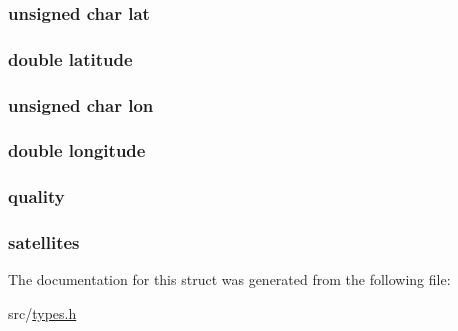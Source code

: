 \subsubsection[{\texorpdfstring{lat}{lat}}]{\setlength{\rightskip}{0pt plus 5cm}unsigned char lat}\hypertarget{structgga_a6a2e4ad53afd61fcd716002fc2965220}{}\label{structgga_a6a2e4ad53afd61fcd716002fc2965220}
\subsubsection[{\texorpdfstring{latitude}{latitude}}]{\setlength{\rightskip}{0pt plus 5cm}double latitude}\hypertarget{structgga_a76714bdbc5c536fa77dfb14533ff82a9}{}\label{structgga_a76714bdbc5c536fa77dfb14533ff82a9}
\subsubsection[{\texorpdfstring{lon}{lon}}]{\setlength{\rightskip}{0pt plus 5cm}unsigned char lon}\hypertarget{structgga_a7e55b80071251dcef4239e60122980a4}{}\label{structgga_a7e55b80071251dcef4239e60122980a4}
\subsubsection[{\texorpdfstring{longitude}{longitude}}]{\setlength{\rightskip}{0pt plus 5cm}double longitude}\hypertarget{structgga_ac155e35fdeebafc89723a51520fb9fe6}{}\label{structgga_ac155e35fdeebafc89723a51520fb9fe6}
\subsubsection[{\texorpdfstring{quality}{quality}}]{ quality}\hypertarget{structgga_a0b48c8041be823080e6346c1731a54ed}{}\label{structgga_a0b48c8041be823080e6346c1731a54ed}
\subsubsection[{\texorpdfstring{satellites}{satellites}}]{ satellites}\hypertarget{structgga_aa306fbda3e6f642c3668c299361d25d0}{}\label{structgga_aa306fbda3e6f642c3668c299361d25d0}


The documentation for this struct was generated from the following file\+:\begin{DoxyCompactItemize}
\item 
src/\hyperlink{types_8h}{types.\+h}\end{DoxyCompactItemize}
